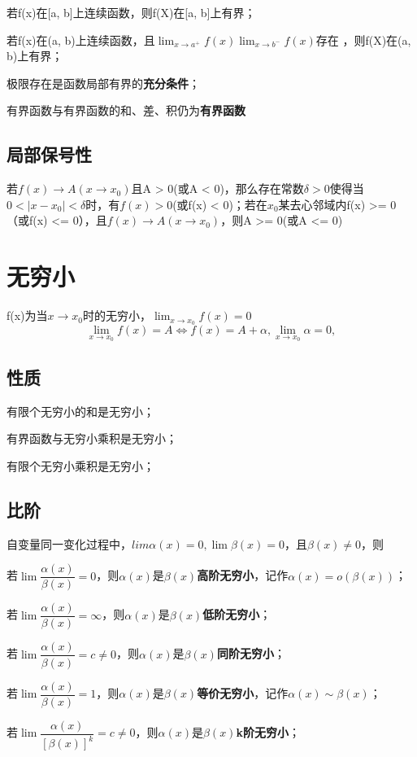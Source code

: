 若f(x)在[a, b]上连续函数，则f(X)在[a, b]上有界；

若f(x)在(a, b)上连续函数，且\(\displaystyle \lim_{x \to a^+}f(x)\lim_{x \to b^-}f(x)\)存在 ，则f(X)在(a, b)上有界；

极限存在是函数局部有界的\textbf{充分条件}；

有界函数与有界函数的和、差、积仍为\textbf{有界函数}


\subsection{局部保号性}
若\(f(x) \to A(x \to x_0)\)且A > 0(或A < 0)，那么存在常数\(\delta > 0\)使得当\(0 < |x - x_0| < \delta\)时，有\(f(x) > 0\)(或f(x) < 0)；若在\(x_0\)某去心邻域内f(x) >= 0（或f(x) <= 0），且\(f(x) \to A(x \to x_0)\)，则A >= 0(或A <= 0)


\section{无穷小}
f(x)为当\(x \to x_0\)时的无穷小，\(\displaystyle \lim_{x \to x_0}f(x) = 0\)
\[\lim_{x \to x_0}f(x) = A \Leftrightarrow f(x) = A + \alpha,\lim_{x \to x_0}\alpha = 0,\]

\subsection{性质}
有限个无穷小的和是无穷小；

有界函数与无穷小乘积是无穷小；

有限个无穷小乘积是无穷小；


\subsection{比阶}
自变量同一变化过程中，\(lim\alpha(x) = 0, \lim\beta(x) = 0\)，且\(\beta(x) \neq 0\)，则

若\(\lim\dfrac{\alpha(x)}{\beta(x)} = 0\)，则\(\alpha(x)\)是\(\beta(x)\)\textbf{高阶无穷小}，记作\(\alpha(x) = o(\beta(x))\)；

若\(\lim\dfrac{\alpha(x)}{\beta(x)} = \infty\)，则\(\alpha(x)\)是\(\beta(x)\)\textbf{低阶无穷小}；

若\(\lim\dfrac{\alpha(x)}{\beta(x)} = c \neq 0\)，则\(\alpha(x)\)是\(\beta(x)\)\textbf{同阶无穷小}；

若\(\lim\dfrac{\alpha(x)}{\beta(x)} = 1\)，则\(\alpha(x)\)是\(\beta(x)\)\textbf{等价无穷小}，记作\(\alpha(x) \sim \beta(x)\)；

若\(\lim\dfrac{\alpha(x)}{[\beta(x)]^k} = c \neq 0\)，则\(\alpha(x)\)是\(\beta(x)\)\textbf{k阶无穷小}；

